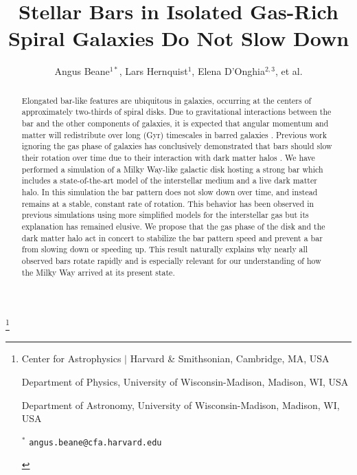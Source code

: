 \documentclass{natureprintstyle}
\title{Stellar Bars in Isolated Gas-Rich Spiral Galaxies Do Not Slow Down}
\author{Angus Beane$^{1*}$, Lars Hernquist$^1$, Elena D'Onghia$^{2,3}$, et al.}
\begin{document}
\maketitle

{\let\thefootnote\relax\footnote{

\begin{affiliations}
\item Center for Astrophysics $|$ Harvard \& Smithsonian,  Cambridge, MA, USA

\item Department of Physics, University of Wisconsin-Madison, Madison, WI, USA

\item Department of Astronomy, University of Wisconsin-Madison, Madison, WI, USA

$^{*}$ \texttt{\mbox{angus.beane@cfa.harvard.edu}}

\end{affiliations}
}}


\vspace{-3.5mm}
\begin{abstract}
  
  Elongated bar-like features are ubiquitous in galaxies, occurring at the
  centers of approximately two-thirds of spiral
  disks\cite{2000AJ....119..536E, 2007ApJ...657..790M}.  Due to gravitational
  interactions between the bar and the other components of galaxies, it is
  expected that angular momentum and matter will redistribute over long (Gyr)
  timescales in barred galaxies \cite{1972MNRAS.157....1L,
  1984MNRAS.209..729T, 1985MNRAS.213..451W}. Previous work ignoring the gas
  phase of galaxies has conclusively demonstrated that bars should slow their
  rotation over time due to their interaction with dark matter halos
  \cite{1992ApJ...400...80H, 2000ApJ...543..704D, 2002MNRAS.330...35A,
  2002ApJ...569L..83A, 2003MNRAS.341.1179A, 2003MNRAS.346..251O,
  2005MNRAS.363..991H, 2006ApJ...637..214M, 2007MNRAS.375..460W,
  2009ApJ...697..293D}. We have performed a simulation of a Milky Way-like
  galactic disk hosting a strong bar which includes a state-of-the-art model
  of the interstellar medium and a live dark matter halo. In this simulation
  the bar pattern does not slow down over time, and instead remains at a
  stable, constant rate of rotation. This behavior has been observed in
  previous simulations using more simplified models for the interstellar gas
  but its explanation has remained elusive\cite{1993AA...268...65F,
  2010ApJ...719.1470V}. We propose that the gas phase of the disk and the dark
  matter halo act in concert to stabilize the bar pattern speed and prevent a
  bar from slowing down or speeding up. This result naturally explains why
  nearly all observed bars rotate rapidly\cite{2011MSAIS..18...23C,
  2015AA...576A.102A, 2019MNRAS.482.1733G} and is especially relevant for our
  understanding of how the Milky Way arrived at its present state.
  
\end{abstract}
\end{document}
